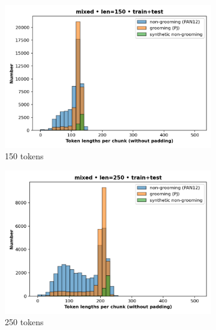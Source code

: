 \begin{figure}[H]
  \centering
  \begin{subfigure}[t]{0.34\textwidth}\centering
    \includegraphics[width=\linewidth]{figures/chunkin_150_dist.png}
    \caption{150 tokens}\label{fig:chunkdist150}
  \end{subfigure}\hspace{-0.5em}%
  \begin{subfigure}[t]{0.34\textwidth}\centering
    \includegraphics[width=\linewidth]{figures/chunking_250_dist.png}
    \caption{250 tokens}\label{fig:chunkdist250}
  \end{subfigure}\hspace{-0.5em}%
  \begin{subfigure}[t]{0.34\textwidth}\centering

\end{subfigure}
\end{figure}
